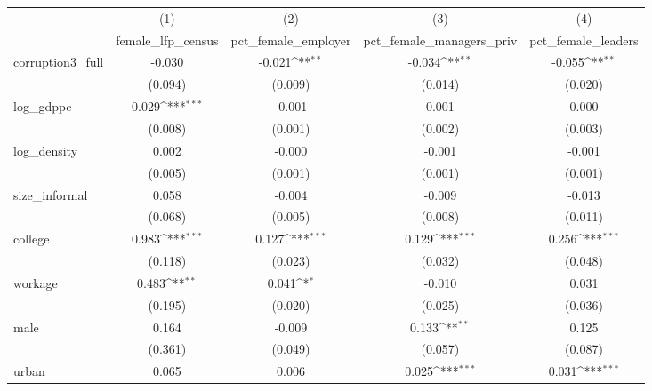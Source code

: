 {
\def\sym#1{\ifmmode^{#1}\else\(^{#1}\)\fi}
\begin{tabular}{l*{4}{c}}
\hline\hline
            &\multicolumn{1}{c}{(1)}&\multicolumn{1}{c}{(2)}&\multicolumn{1}{c}{(3)}&\multicolumn{1}{c}{(4)}\\
            &\multicolumn{1}{c}{female\_lfp\_census}&\multicolumn{1}{c}{pct\_female\_employer}&\multicolumn{1}{c}{pct\_female\_managers\_priv}&\multicolumn{1}{c}{pct\_female\_leaders}\\
\hline
corruption3\_full&      -0.030         &      -0.021\sym{**} &      -0.034\sym{**} &      -0.055\sym{**} \\
            &     (0.094)         &     (0.009)         &     (0.014)         &     (0.020)         \\
[1em]
log\_gdppc   &       0.029\sym{***}&      -0.001         &       0.001         &       0.000         \\
            &     (0.008)         &     (0.001)         &     (0.002)         &     (0.003)         \\
[1em]
log\_density &       0.002         &      -0.000         &      -0.001         &      -0.001         \\
            &     (0.005)         &     (0.001)         &     (0.001)         &     (0.001)         \\
[1em]
size\_informal&       0.058         &      -0.004         &      -0.009         &      -0.013         \\
            &     (0.068)         &     (0.005)         &     (0.008)         &     (0.011)         \\
[1em]
college     &       0.983\sym{***}&       0.127\sym{***}&       0.129\sym{***}&       0.256\sym{***}\\
            &     (0.118)         &     (0.023)         &     (0.032)         &     (0.048)         \\
[1em]
workage     &       0.483\sym{**} &       0.041\sym{*}  &      -0.010         &       0.031         \\
            &     (0.195)         &     (0.020)         &     (0.025)         &     (0.036)         \\
[1em]
male        &       0.164         &      -0.009         &       0.133\sym{**} &       0.125         \\
            &     (0.361)         &     (0.049)         &     (0.057)         &     (0.087)         \\
[1em]
urban       &       0.065         &       0.006         &       0.025\sym{***}&       0.031\sym{***}\\

\end{tabular}}
